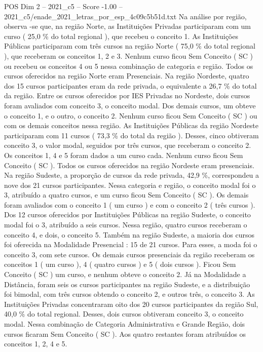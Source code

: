 \begin{textsample}{POS Dim 2 – 2021\_c5 – Score -1.00 – 2021\_c5/enade\_2021\_letras\_por\_esp\_4c09c5b51d.txt}
Na análise por região, observa -se que, na região Norte, as Instituições Privadas participaram com um curso ( 25,0 \% do total regional ), que recebeu o conceito 1.
As Instituições Públicas participaram com três cursos na região Norte ( 75,0 \% do total regional ), que receberam os conceitos 1, 2 e 3.
Nenhum curso ficou Sem Conceito ( SC ) ou recebeu os conceitos 4 ou 5 nessa combinação de categoria e região.
Todos os cursos oferecidos na região Norte eram Presenciais.
Na região Nordeste, quatro dos 15 cursos participantes eram da rede privada, o equivalente a 26,7 \% do total da região.
Entre os cursos oferecidos por IES Privadas no Nordeste, dois cursos foram avaliados com conceito 3, o conceito modal.
Dos demais cursos, um obteve o conceito 1, e o outro, o conceito 2.
Nenhum curso ficou Sem Conceito ( SC ) ou com os demais conceitos nessa região.
As Instituições Públicas da região Nordeste participaram com 11 cursos ( 73,3 \% do total da região ).
Desses, cinco obtiveram conceito 3, o valor modal, seguidos por três cursos, que receberam o conceito 2.
Os conceitos 1, 4 e 5 foram dados a um curso cada.
Nenhum curso ficou Sem Conceito ( SC ).
Todos os cursos oferecidos na região Nordeste eram presenciais.
Na região Sudeste, a proporção de cursos da rede privada, 42,9 \%, correspondeu a nove dos 21 cursos participantes.
Nessa categoria e região, o conceito modal foi o 3, atribuído a quatro cursos, e um curso ficou Sem Conceito ( SC ).
Os demais foram avaliados com o conceito 1 ( um curso ) e com o conceito 2 ( três cursos ).
Dos 12 cursos oferecidos por Instituições Públicas na região Sudeste, o conceito modal foi o 3, atribuído a seis cursos.
Nessa região, quatro cursos receberam o conceito 4, e dois, o conceito 5.
Também na região Sudeste, a maioria dos cursos foi oferecida na Modalidade Presencial : 15 de 21 cursos.
Para esses, a moda foi o conceito 3, com sete cursos.
Os demais cursos presenciais da região receberam os conceitos 1 ( um curso ), 4 ( quatro cursos ) e 5 ( dois cursos ).
Ficou Sem Conceito ( SC ) um curso, e nenhum obteve o conceito 2.
Já na Modalidade a Distância, foram seis os cursos participantes na região Sudeste, e a distribuição foi bimodal, com três cursos obtendo o conceito 2, e outros três, o conceito 3.
As Instituições Privadas concentraram oito dos 20 cursos participantes da região Sul, 40,0 \% do total regional.
Desses, dois cursos obtiveram conceito 3, o conceito modal.
Nessa combinação de Categoria Administrativa e Grande Região, dois cursos ficaram Sem Conceito ( SC ).
Aos quatro restantes foram atribuídos os conceitos 1, 2, 4 e 5.

\end{textsample}
